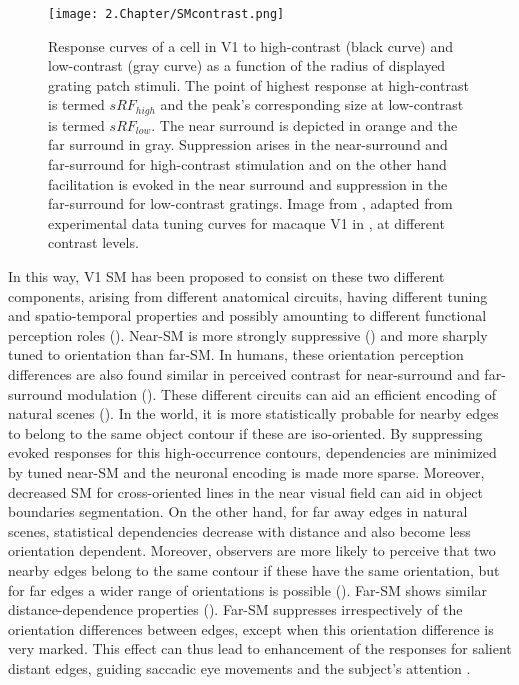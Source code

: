 \begin{figure}[H]
\center
\texttt{[image: 2.Chapter/SMcontrast.png]}
\caption{Response curves of a cell in V1 to high-contrast (black curve) and low-contrast (gray curve) as a function of the radius of displayed grating patch stimuli. The point of highest response at high-contrast is termed $sRF_{high}$ and the peak's corresponding size at low-contrast is termed $sRF_{low}$. The near surround is depicted in orange and the far surround in gray. Suppression arises in the near-surround and far-surround for high-contrast stimulation and on the other hand facilitation is evoked in the near surround and suppression in the far-surround for low-contrast gratings.
\newline \newline \tiny{Image from \cite{Angelucci2017}, adapted from experimental data tuning curves for macaque V1 in \cite{Shushruth2009}, at different contrast levels.}}
\label{SMcontrast}
\end{figure}

In this way, V1 SM has been proposed to consist on these two different components, arising from different anatomical circuits, having different tuning and spatio-temporal properties and possibly amounting to different functional perception roles (\cite{Nurminen2014}). Near-SM is more strongly suppressive (\cite{Shushruth2009}) and more sharply tuned to orientation than far-SM. In humans, these orientation perception differences are also found similar in perceived contrast for near-surround and far-surround modulation (\cite{Shushruth2013}). These different circuits can aid an efficient encoding of natural scenes (\cite{Sushruth2013}). In the world, it is more statistically probable for nearby edges to belong to the same object contour if these are iso-oriented. By suppressing evoked responses for this high-occurrence contours, dependencies are minimized by tuned near-SM and the neuronal encoding is made more sparse. Moreover, decreased SM for cross-oriented lines in the near visual field can aid in object boundaries segmentation. On the other hand, for far away edges in natural scenes, statistical dependencies decrease with distance and also become less orientation dependent. Moreover, observers are more likely to perceive that two nearby edges belong to the same contour if these have the same orientation, but for far edges a wider range of orientations is possible (\cite{Wertheimer1958}). Far-SM shows similar distance-dependence properties (\cite{Nurminen2014}). Far-SM suppresses irrespectively of the orientation differences between edges, except when this orientation difference is very marked. This effect can thus lead to enhancement of the responses for salient distant edges, guiding saccadic eye movements and the subject's attention \cite{Petrov2006}.

